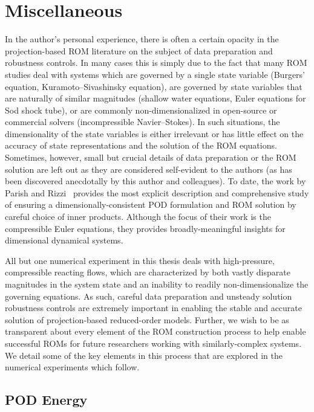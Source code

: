 \section{Miscellaneous}

In the author's personal experience, there is often a certain opacity in the projection-based ROM literature on the subject of data preparation and robustness controls. In many cases this is simply due to the fact that many ROM studies deal with systems which are governed by a single state variable (Burgers' equation, Kuramoto--Sivashinsky equation), are governed by state variables that are naturally of similar magnitudes (shallow water equations, Euler equations for Sod shock tube), or are commonly non-dimensionalized in open-source or commercial solvers (incompressible Navier--Stokes). In such situations, the dimensionality of the state variables is either irrelevant or has little effect on the accuracy of state representations and the solution of the ROM equations. Sometimes, however, small but crucial details of data preparation or the ROM solution are left out as they are considered self-evident to the authors (as has been discovered anecdotally by this author and colleagues). To date, the work by Parish and Rizzi~\cite{Parish2022} provides the most explicit description and comprehensive study of ensuring a dimensionally-consistent POD formulation and ROM solution by careful choice of inner products. Although the focus of their work is the compressible Euler equations, they provides broadly-meaningful insights for dimensional dynamical systems.

All but one numerical experiment in this thesis deals with high-pressure, compressible reacting flows, which are characterized by both vastly disparate magnitudes in the system state and an inability to readily non-dimensionalize the governing equations. As such, careful data preparation and unsteady solution robustness controls are extremely important in enabling the stable and accurate solution of projection-based reduced-order models. Further, we wish to be as transparent about every element of the ROM construction process to help enable successful ROMs for future researchers working with similarly-complex systems. We detail some of the key elements in this process that are explored in the numerical experiments which follow.

\subsection{POD Energy}

